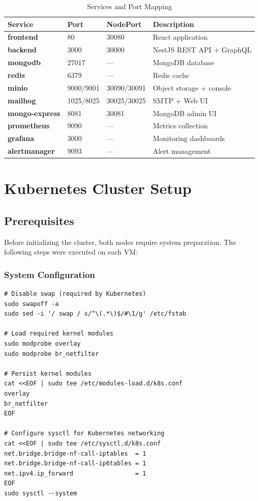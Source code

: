 \documentclass[12pt,a4paper]{report}
\begin{document}
\begin{table}[H]
  \centering
  \begin{tabular}{>{\bfseries}p{3.5cm} p{2cm} p{3cm} p{4.5cm}}
    \toprule
    \textbf{Service} & \textbf{Port} & \textbf{NodePort} & \textbf{Description} \\
    \midrule
    frontend & 80 & 30080 & React application \\
    backend & 3000 & 30000 & NestJS REST API + GraphQL \\
    mongodb & 27017 & --- & MongoDB database \\
    redis & 6379 & --- & Redis cache \\
    minio & 9000/9001 & 30090/30091 & Object storage + console \\
    mailhog & 1025/8025 & 30025/30025 & SMTP + Web UI \\
    mongo-express & 8081 & 30081 & MongoDB admin UI \\
    prometheus & 9090 & --- & Metrics collection \\
    grafana & 3000 & --- & Monitoring dashboards \\
    alertmanager & 9093 & --- & Alert management \\
    \bottomrule
  \end{tabular}
  \caption{Services and Port Mapping}
\end{table}

\chapter{Kubernetes Cluster Setup}

\section{Prerequisites}

Before initializing the cluster, both nodes require system preparation. The following steps were executed on each VM:

\subsection{System Configuration}

\begin{lstlisting}[style=bashstyle, caption={System Preparation (Both Nodes)}]
# Disable swap (required by Kubernetes)
sudo swapoff -a
sudo sed -i '/ swap / s/^\(.*\)$/#\1/g' /etc/fstab

# Load required kernel modules
sudo modprobe overlay
sudo modprobe br_netfilter

# Persist kernel modules
cat <<EOF | sudo tee /etc/modules-load.d/k8s.conf
overlay
br_netfilter
EOF

# Configure sysctl for Kubernetes networking
cat <<EOF | sudo tee /etc/sysctl.d/k8s.conf
net.bridge.bridge-nf-call-iptables  = 1
net.bridge.bridge-nf-call-ip6tables = 1
net.ipv4.ip_forward                 = 1
EOF
sudo sysctl --system
\end{lstlisting}
\end{document}
